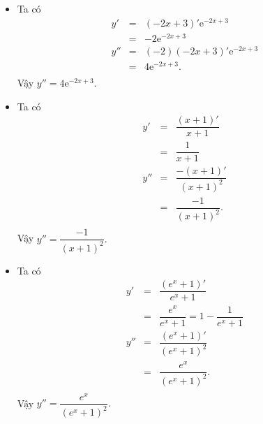 \begin{bt}
{\begin{itemize}
\begin{eqnarray*}
				&=&-5\sin 2x \cos x- 4\cos 2x\sin x\\
			\end{eqnarray*}
			Vậy $y''=-5\sin 2x \cos x- 4\cos 2x\sin x.$
			\item[d)]  Ta có 
			\allowdisplaybreaks
			\begin{eqnarray*}
				y'&=&(-2 x+3)'\mathrm{e}^{-2 x+3}\\
				&=&-2 \mathrm{e}^{-2 x+3}\\
				y''&=&(-2)(-2 x+3)'\mathrm{e}^{-2 x+3}\\
				&=& 4 \mathrm{e}^{-2 x+3}.\\
			\end{eqnarray*}
			Vậy $y''=4 \mathrm{e}^{-2 x+3}.$
			\item[e)] Ta có 
			\allowdisplaybreaks
			\begin{eqnarray*}
				y'&=&\dfrac{(x+1)'}{x+1}\\
				&=&\dfrac{1}{x+1}\\
				y''&=&\dfrac{-(x+1)'}{(x+1)^2}\\
				&=& \dfrac{-1}{(x+1)^2}.\\
			\end{eqnarray*}
			Vậy $y''=\dfrac{-1}{(x+1)^2}.$
			\item[f)]  Ta có 
			\allowdisplaybreaks
			\begin{eqnarray*}
				y'&=&\dfrac{\left(e^x+1\right)'}{e^x+1}\\
				&=&\dfrac{e^x}{e^x+1}=1-\dfrac{1}{e^x+1}\\
				y''&=&\dfrac{(e^x+1)'}{(e^x+1)^2}\\
				&=& \dfrac{e^x}{(e^x+1)^2}.\\
			\end{eqnarray*}
			Vậy $y''=\dfrac{e^x}{(e^x+1)^2}.$
		\end{itemize}
	}
\end{bt}

